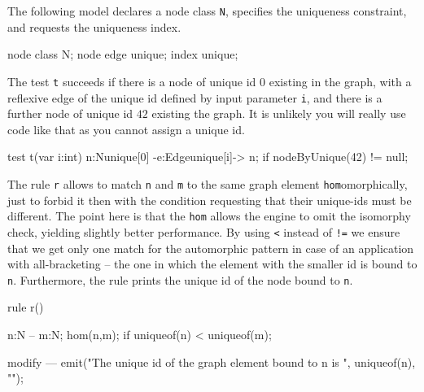 \begin{example}

The following model declares a node class \texttt{N}, specifies the uniqueness constraint, and requests the uniqueness index.
 
\begin{grgen}
node class N;
node edge unique;
index unique;
\end{grgen}

The test \texttt{t} succeeds if there is a node of unique id $0$ existing in the graph, with a reflexive edge of the unique id defined by input parameter \texttt{i}, and there is a further node of unique id $42$ existing the graph. It is unlikely you will really use code like that as you cannot assign a unique id.

\begin{grgen}
test t(var i:int) {
  n:N{unique[0]} -e:Edge{unique[i]}-> n;
  if{ nodeByUnique(42) != null; }
}
\end{grgen}

The rule \texttt{r} allows to match \texttt{n} and \texttt{m} to the same graph element \texttt{hom}omorphically, just to forbid it then with the condition requesting that their unique-ids must be different. The point here is that the \texttt{hom} allows the engine to omit the isomorphy check, yielding slightly better performance. By using \verb#<# instead of \verb#!=# we ensure that we get only one match for the automorphic pattern in case of an application with all-bracketing -- the one in which the element with the smaller id is bound to \texttt{n}. Furthermore, the rule prints the unique id of the node bound to \texttt{n}.

\begin{grgen}
rule r() {
  n:N -- m:N;
  hom(n,m);
  if{ uniqueof(n) < uniqueof(m); }
		
  modify {
  ---
    emit("The unique id of the graph element bound to n is ", uniqueof(n), "\n");
  }
}
\end{grgen}

\end{example}


